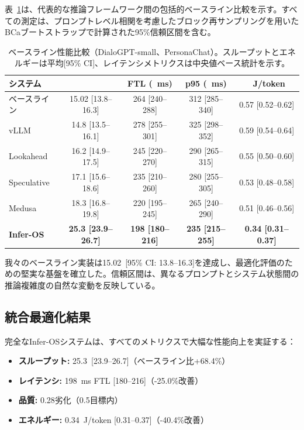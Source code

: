 \documentclass[10pt,twocolumn,a4paper]{jarticle}
\newcommand{\tps}{\text{tok/s}}
\newcommand{\ppl}{\mathrm{PPL}}
\begin{document}
表~\ref{tab:baseline}は、代表的な推論フレームワーク間の包括的ベースライン比較を示す。すべての測定は、プロンプトレベル相関を考慮したブロック再サンプリングを用いたBCaブートストラップで計算された95\%信頼区間を含む。

\begin{table}[t]
\centering
\small
\caption{ベースライン性能比較（DialoGPT-small、PersonaChat）。スループットとエネルギーは平均[95\% CI]、レイテンシメトリクスは中央値ベース統計を示す。}
\label{tab:baseline}
\begin{tabular}{@{}lcccc@{}}
\toprule
\textbf{システム} & \textbf{\tps} & \textbf{FTL (\SI{}{ms})} & \textbf{p95 (\SI{}{ms})} & \textbf{\SI{}{J/token}} \\
\midrule
ベースライン & 15.02 [13.8--16.3] & 264 [240--288] & 312 [285--340] & 0.57 [0.52--0.62] \\
vLLM & 14.8 [13.5--16.1] & 278 [255--301] & 325 [298--352] & 0.59 [0.54--0.64] \\
Lookahead & 16.2 [14.9--17.5] & 245 [220--270] & 290 [265--315] & 0.55 [0.50--0.60] \\
Speculative & 17.1 [15.6--18.6] & 235 [210--260] & 280 [255--305] & 0.53 [0.48--0.58] \\
Medusa & 18.3 [16.8--19.8] & 220 [195--245] & 265 [240--290] & 0.51 [0.46--0.56] \\
\midrule
\textbf{Infer-OS} & \textbf{25.3 [23.9--26.7]} & \textbf{198 [180--216]} & \textbf{235 [215--255]} & \textbf{0.34 [0.31--0.37]} \\
\bottomrule
\end{tabular}
\end{table}

我々のベースライン実装は\SI{15.02}{\tps}\ [95\% CI: 13.8--16.3]を達成し、最適化評価のための堅実な基盤を確立した。信頼区間は、異なるプロンプトとシステム状態間の推論複雑度の自然な変動を反映している。

\subsection{統合最適化結果}

完全なInfer-OSシステムは、すべてのメトリクスで大幅な性能向上を実証する：

\begin{itemize}
\item \textbf{スループット:} \SI{25.3}{\tps}\ [23.9--26.7]（ベースライン比+68.4\%）
\item \textbf{レイテンシ:} \SI{198}{ms} FTL [180--216]（-25.0\%改善）
\item \textbf{品質:} \SI{0.28}{\ppl}劣化（\SI{0.5}{\ppl}目標内）
\item \textbf{エネルギー:} \SI{0.34}{J/token} [0.31--0.37]（-40.4\%改善）
\end{itemize}
\end{document}
